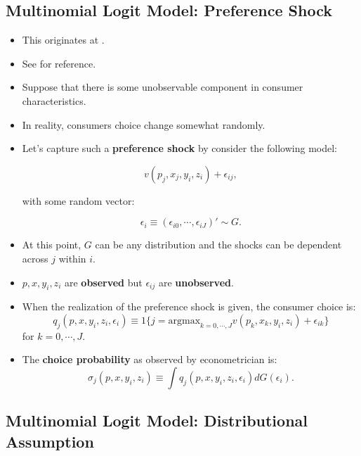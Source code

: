 \documentclass[]{book}
\providecommand{\tightlist}{%
  \setlength{\itemsep}{0pt}\setlength{\parskip}{0pt}}
\begin{document}
\subsection{Multinomial Logit Model: Preference
Shock}\label{multinomial-logit-model-preference-shock}

\begin{itemize}
\tightlist
\item
  This originates at \citet{Mcfadden1974}.
\item
  See \citet{Train2009} for reference.
\item
  Suppose that there is some unobservable component in consumer
  characteristics.
\item
  In reality, consumers choice change somewhat randomly.
\item
  Let's capture such a \textbf{preference shock} by consider the
  following model:

  \begin{equation}
  v(p_j, x_j, y_i, z_i) + \epsilon_{ij},
  \end{equation}

  with some random vector:

  \begin{equation}
  \epsilon_i \equiv (\epsilon_{i0}, \cdots, \epsilon_{iJ})' \sim G.
  \end{equation}
\item
  At this point, \(G\) can be any distribution and the shocks can be
  dependent across \(j\) within \(i\).
\item
  \(p, x, y_i, z_i\) are \textbf{observed} but \(\epsilon_{ij}\) are
  \textbf{unobserved}.
\item
  When the realization of the preference shock is given, the consumer
  choice is: \[
  q_j(p, x, y_i, z_i, \epsilon_{i}) \equiv 1\{j = \text{argmax}_{k = 0, \cdots, J} v(p_k, x_k, y_i, z_i) + \epsilon_{ik}\}
  \] for \(k = 0, \cdots, J\).
\item
  The \textbf{choice probability} as observed by econometrician is: \[
  \sigma_j(p, x, y_i, z_i) \equiv \int q_j(p, x, y_i, z_i, \epsilon_{i}) dG(\epsilon_i).
  \]
\end{itemize}

\subsection{Multinomial Logit Model: Distributional
Assumption}\label{multinomial-logit-model-distributional-assumption}
\end{document}
